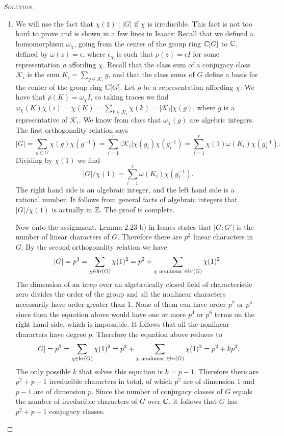 \begin{proof}[{\scshape Solution}]
\begin{enumerate}[font=\normalfont,label=\textbf{(\Alph*)}, wide]
    \item We will use the fact that $\chi(1)\mid \lvert G \rvert$ if $\chi$ is irreducible. This fact is not too hard to prove and is shown in a few lines in Isaacs: Recall that we defined a homomorphism $\omega_\chi$, going from the center of the group ring $\mathbb{C}[G]$ to $\mathbb{C}$, defined by $\omega(z) = \epsilon$, where $\epsilon_\chi$ is such that $\rho(z) = \epsilon I$ for some representation $\rho$ affording $\chi$. Recall that the class sum of a conjugacy class $\mathcal{K}_i$ is the sum $K_i = \sum_{g\in \mathcal{K}_i} g$, and that the class sums of $G$ define a basis for the center of the group ring $\mathbb{C}[G]$. Let $\rho$ be a representation affording $\chi$. We have that $\rho(K) = \omega_\chi I$, so taking traces we find $\omega_\chi(K)\chi(i)= \chi(K) = \sum_{k \in \mathcal{K_i}} \chi(k) = \lvert \mathcal{K}_i \rvert \chi(g)$, where $g$ is a representative of $\mathcal{K}_i$. We know from class that $\omega_\chi(g)$ are algebric integers. The first orthogonality relation says
    \[
      \lvert G \rvert = \sum_{g \in G} \chi(g)\chi(g^{-1}) = \sum_{i = 1}^r \lvert \mathcal{K}_i \rvert \chi(g_i) \chi(g_i^{-1}) = \sum_{i = 1}^r \chi(1) \omega(K_i) \chi(g_i^{-1}).
    \]
    Dividing by $\chi(1)$ we find
    \[
    \lvert G \rvert/\chi(1) = \sum_{i = 1}^r \omega(K_i) \chi(g_i^{-1}).
    \]
    The right hand side is an algebraic integer, and the left hand side is a rational number. It follows from general facts of algebraic integers that $\lvert G \rvert/\chi(1)$ is actually in $\mathbb{Z}$. The proof is complete.


    Now onto the assignment. Lemma 2.23 b) in Isaacs states that $\lvert G : G'\rvert$ is the number of linear characters of $G$. Therefore there are $p^2$ linear characters in $G$. By the second orthogonality relation we have
  \[
\lvert G \rvert = p^3 = \sum_{\chi \in \mathsf{Irr}(G)} \chi(1)^2 = p^2 + \sum_{\chi \text{ nonlinear } \in \mathsf{Irr}(G)} \chi(1)^2.
  \]
    The dimension of an irrep over an algebraically closed field of characteristic zero divides the order of the group and all the nonlinear characters necessarily have order greater than 1. None of them can have order $p^2$ or $p^3$ since then the equation above would have one or more $p^4$ or $p^6$ terms on the right hand side, which is impossible. It follows that all the nonlinear characters have degree $p$. Therefore the equation above reduces to
    \[
    \begin{aligned}
      \lvert G \rvert = p^3 = \sum_{\chi \in \mathsf{Irr}(G)} \chi(1)^2 = p^2 + \sum_{\chi \text{ nonlinear } \in \mathsf{Irr}(G)} \chi(1)^2 = p^2 + kp^2.
    \end{aligned}
    \]
    The only possible $k$ that solves this equation is $k = p-1$. Therefore there are $p^2 + p-1$ irreducible characters in total, of which $p^2$ are of dimension 1 and $p-1$ are of dimension $p$. Since the number of conjugacy classes of $G$ equals the number of irreducible characters of $G$ over $\mathbb{C}$, it follows that $G$ has $p^2 + p-1$ conjugacy classes.


\end{enumerate}
\end{proof}
